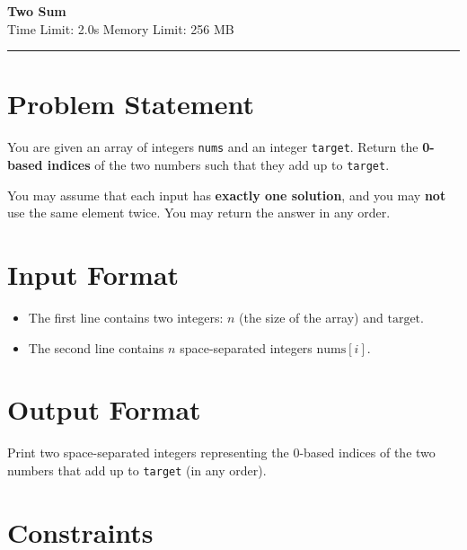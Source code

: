 \documentclass[a4paper,11pt]{article}
\begin{document}
\begin{center}
    {\LARGE \textbf{Two Sum}} \\[0.4em]
    {\large Time Limit: 2.0s \quad Memory Limit: 256 MB}
\end{center}

\hrule
\vspace{1em}

\section*{Problem Statement}

You are given an array of integers \texttt{nums} and an integer \texttt{target}.
Return the \textbf{0-based indices} of the two numbers such that they add up to
\texttt{target}.

You may assume that each input has \textbf{exactly one solution}, and you may
\textbf{not} use the same element twice. You may return the answer in any order.

\section*{Input Format}

\begin{itemize}
    \item The first line contains two integers: $n$ (the size of the array) and
          $\text{target}$.
    \item The second line contains $n$ space-separated integers $\text{nums}[i]$.
\end{itemize}

\section*{Output Format}

Print two space-separated integers representing the 0-based indices of the two
numbers that add up to \texttt{target} (in any order).

\section*{Constraints}
\end{document}
